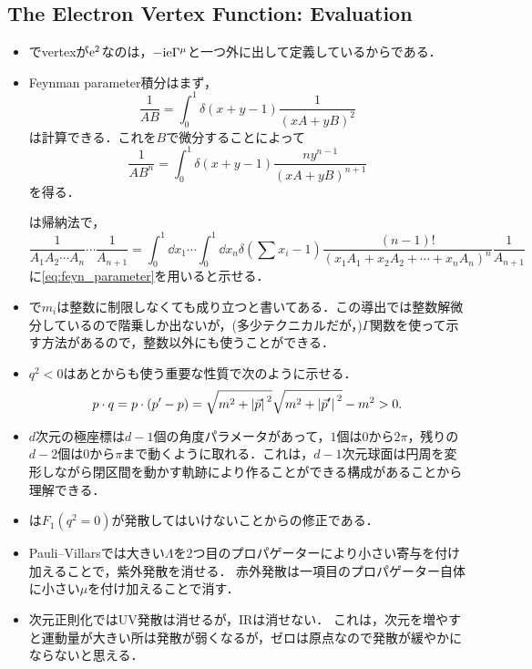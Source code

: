 \subsection{The Electron Vertex Function: Evaluation}
\begin{itemize}
	\item {}でvertexが$\mathrm{e}^2$なのは，$-\mathrm{i}\mathrm{e}\Gamma^{\mu}$と一つ外に出して定義しているからである．
	\item Feynman parameter積分はまず，
		\begin{equation}
			\frac{1}{AB} = \int_0^1 \delta(x+y-1) \frac{1}{(xA+yB)^2}
		\end{equation}
		は計算できる．これを$B$で微分することによって
		\begin{equation}
			\frac{1}{AB^n} = \int_0^1\delta(x+y-1)\frac{ny^{n-1}}{(xA+yB)^{n+1}}\label{eq:feyn_parameter}
		\end{equation}
		を得る．
		
		は帰納法で，
		\begin{equation}
			\frac{1}{A_1A_2\cdots A_n}\cdots\frac{1}{A_{n+1}} 
			= \int_0^1\dd{x_1}\cdots\int_0^1\dd{x_n}\delta(\sum x_i-1)\frac{(n-1)!}{(x_1A_1 + x_2A_2 + \cdots + x_nA_n)^n}\frac{1}{A_{n+1}}
		\end{equation}
		に\eqref{eq:feyn_parameter}を用いると示せる．
	\item {}で$m_i$は整数に制限しなくても成り立つと書いてある．この導出では整数解微分しているので階乗しか出ないが，(多少テクニカルだが，)$\Gamma$関数を使って示す方法があるので，整数以外にも使うことができる．

	\item $q^2<0$はあとからも使う重要な性質で次のように示せる．
		\begin{equation}
			p\cdot q = p\cdot (p'-p) = \sqrt{m^2 + \abs*{\vec{p}}^2}\sqrt{m^2 + \abs*{\vec{p}'}^2} - m^2 > 0.
		\end{equation}
	\item $d$次元の極座標は$d-1$個の角度パラメータがあって，$1$個は$0$から$2\pi$，残りの$d-2$個は$0$から$\pi$まで動くように取れる．これは，$d-1$次元球面は円周を変形しながら閉区間を動かす軌跡により作ることができる構成があることから理解できる．
	\item {}は$F_1(q^2=0)$が発散してはいけないことからの修正である．
	\item Pauli--Villarsでは大きい$\Lambda$を2つ目のプロパゲーターにより小さい寄与を付け加えることで，紫外発散を消せる．
		赤外発散は一項目のプロパゲーター自体に小さい$\mu$を付け加えることで消す．
	\item 次元正則化ではUV発散は消せるが，IRは消せない．
		これは，次元を増やすと運動量が大きい所は発散が弱くなるが，ゼロは原点なので発散が緩やかにならないと思える．
\end{itemize}


